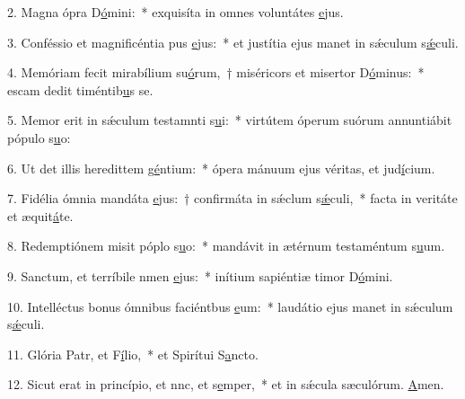 2. Magna ópra D\uline{ó}mini:~* exquisíta in omnes voluntátes \uline{e}jus.\par 
3. Conféssio et magnificéntia pus \uline{e}jus:~* et justítia ejus manet in sǽculum s\uline{ǽ}culi.\par 
4. Memóriam fecit mirabílium su\uline{ó}rum,~† miséricors et misertor D\uline{ó}minus:~* escam dedit timéntib\uline{u}s se.\par 
5. Memor erit in sǽculum testamnti s\uline{u}i:~* virtútem óperum suórum annuntiábit pópulo s\uline{u}o:\par 
6. Ut det illis heredittem g\uline{é}ntium:~* ópera mánuum ejus véritas, et jud\uline{í}cium.\par 
7. Fidélia ómnia mandáta \uline{e}jus:~† confirmáta in sǽclum s\uline{ǽ}culi,~* facta in veritáte et æquit\uline{á}te.\par 
8. Redemptiónem misit póplo s\uline{u}o:~* mandávit in ætérnum testaméntum s\uline{u}um.\par 
9. Sanctum, et terríbile nmen \uline{e}jus:~* inítium sapiéntiæ timor D\uline{ó}mini.\par 
10. Intelléctus bonus ómnibus faciéntbus \uline{e}um:~* laudátio ejus manet in sǽculum s\uline{ǽ}culi.\par 
11. Glória Patr, et F\uline{í}lio,~* et Spirítui S\uline{a}ncto.\par 
12. Sicut erat in princípio, et nnc, et s\uline{e}mper,~* et in sǽcula sæculórum. \uline{A}men.\par 
